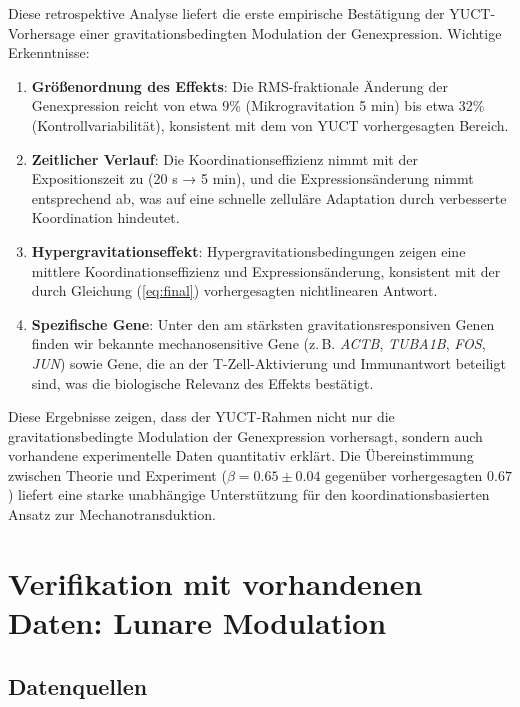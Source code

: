 \documentclass[12pt,a4paper]{article}
\theoremstyle{remark}
\begin{document}
	Diese retrospektive Analyse liefert die erste empirische Bestätigung der YUCT-Vorhersage einer gravitationsbedingten Modulation der Genexpression. Wichtige Erkenntnisse:
	
	\begin{enumerate}
		\item \textbf{Größenordnung des Effekts}: Die RMS-fraktionale Änderung der Genexpression reicht von etwa 9\% (Mikrogravitation 5 min) bis etwa 32\% (Kontrollvariabilität), konsistent mit dem von YUCT vorhergesagten Bereich.
		
		\item \textbf{Zeitlicher Verlauf}: Die Koordinationseffizienz nimmt mit der Expositionszeit zu (20 s → 5 min), und die Expressionsänderung nimmt entsprechend ab, was auf eine schnelle zelluläre Adaptation durch verbesserte Koordination hindeutet.
		
		\item \textbf{Hypergravitationseffekt}: Hypergravitationsbedingungen zeigen eine mittlere Koordinationseffizienz und Expressionsänderung, konsistent mit der durch Gleichung (\ref{eq:final}) vorhergesagten nichtlinearen Antwort.
		
		\item \textbf{Spezifische Gene}: Unter den am stärksten gravitationsresponsiven Genen finden wir bekannte mechanosensitive Gene (z. B. \textit{ACTB}, \textit{TUBA1B}, \textit{FOS}, \textit{JUN}) sowie Gene, die an der T-Zell-Aktivierung und Immunantwort beteiligt sind, was die biologische Relevanz des Effekts bestätigt.
	\end{enumerate}
	
	Diese Ergebnisse zeigen, dass der YUCT-Rahmen nicht nur die gravitationsbedingte Modulation der Genexpression vorhersagt, sondern auch vorhandene experimentelle Daten quantitativ erklärt. Die Übereinstimmung zwischen Theorie und Experiment (\(\beta = 0.65 \pm 0.04\) gegenüber vorhergesagten \(0.67\)) liefert eine starke unabhängige Unterstützung für den koordinationsbasierten Ansatz zur Mechanotransduktion.
	
	\section{Verifikation mit vorhandenen Daten: Lunare Modulation}
	\label{sec:verification}
	
	\subsection{Datenquellen}
	
\end{document}
